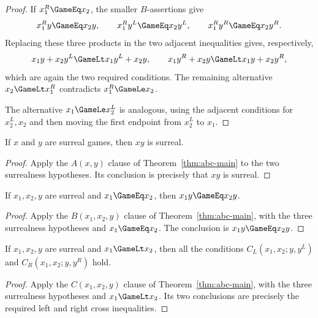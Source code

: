 \begin{proof}
  If \(x_1^R\GameEq x_2\), the smaller \(B\)-assertions give
  \[
    x_1^Ry\GameEq x_2y,\qquad
    x_1^Ry^L\GameEq x_2y^L,\qquad
    x_1^Ry^R\GameEq x_2y^R.
  \]
  Replacing these three products in the two adjacent inequalities gives,
  respectively,
  \[
    x_1y+x_2y^L\GameLt x_1y^L+x_2y,
    \qquad
    x_1y^R+x_2y\GameLt x_1y+x_2y^R,
  \]
  which are again the two required conditions.  The remaining alternative
  \(x_2\GameLt x_1^R\) contradicts \(x_1^R\GameLe x_2\).

  The alternative \(x_1\GameLe x_2^L\) is analogous, using the adjacent
  conditions for \(x_2^L,x_2\) and then moving the first endpoint from
  \(x_2^L\) to \(x_1\).
\end{proof}

\begin{theorem}
  \label{thm:conway-a}
  \leanok
  If \(x\) and \(y\) are surreal games, then \(xy\) is surreal.
\end{theorem}
\begin{proof}
  \leanok
  Apply the \(A(x,y)\) clause of Theorem~\ref{thm:abc-main} to the two
  surrealness hypotheses.  Its conclusion is precisely that \(xy\) is
  surreal.
\end{proof}

\begin{theorem}
  \label{thm:conway-b}
  \leanok
  If \(x_1,x_2,y\) are surreal and \(x_1\GameEq x_2\), then
  \(x_1y\GameEq x_2y\).
\end{theorem}
\begin{proof}
  \leanok
  Apply the \(B(x_1,x_2,y)\) clause of Theorem~\ref{thm:abc-main}, with the
  three surrealness hypotheses and \(x_1\GameEq x_2\).  The conclusion is
  \(x_1y\GameEq x_2y\).
\end{proof}

\begin{theorem}
  \label{thm:conway-c}
  \leanok
  If \(x_1,x_2,y\) are surreal and \(x_1\GameLt x_2\), then all the conditions
  \(C_L(x_1,x_2;y,y^L)\) and \(C_R(x_1,x_2;y,y^R)\) hold.
\end{theorem}
\begin{proof}
  \leanok
  Apply the \(C(x_1,x_2,y)\) clause of Theorem~\ref{thm:abc-main}, with the
  three surrealness hypotheses and \(x_1\GameLt x_2\).  Its two conclusions
  are precisely the required left and right cross inequalities.
\end{proof}

